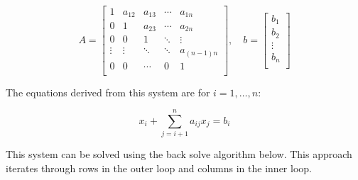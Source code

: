 \documentclass{article}
\begin{document}
\[
A = \begin{bmatrix}
1 & a_{12} & a_{13} & \cdots & a_{1n} \\
0 & 1 & a_{23} & \cdots & a_{2n} \\
0 & 0 & 1 & \ddots & \vdots \\
\vdots & \vdots & \ddots & \ddots & a_{(n-1)n} \\
0 & 0 & \cdots & 0 & 1 \\
\end{bmatrix}, 
\quad b = \begin{bmatrix}
b_{1} \\
b_{2} \\
\vdots \\
b_{n} \\
\end{bmatrix}
\]

The equations derived from this system are for $i = 1, \ldots, n$:

\[
x_i + \sum_{j=i+1}^{n} a_{ij}x_j = b_i
\]

This system can be solved using the back solve algorithm below. This approach iterates through rows in the outer loop and columns in the inner loop.
\end{document}
